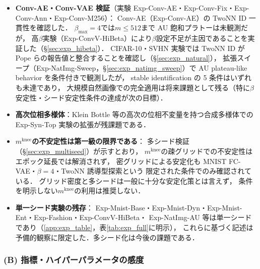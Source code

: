\documentclass[11pt,a4paper]{jsarticle}
\newcommand{\mknee}{m^{\mathrm{knee}}}
\begin{document}
\begin{itemize}
  \item \textbf{Conv-AE・Conv-VAE 検証}（実験 Exp-Conv-AE・Exp-Conv-Fix・Exp-Conv-Ann・Exp-Conv-M256）：
        Conv-AE（Exp-Conv-AE）の TwoNN ID 一貫性を確認した．
        $\beta_{\max}=4$では$m \leq 512$まで AU 飽和プラトーは未観測だが，
        高$\beta$実験（Exp-ConvV-HiBeta）により$\beta$設定不足が主因であることを実証した（§\ref{sec:exp_hibeta}）．
        CIFAR-10・SVHN 実験では TwoNN ID が Pope ら\cite{pope2021intrinsic}の報告値と整合することを確認し（§\ref{sec:exp_natural}），
        拡張スイープ（Exp-NatImg-Sweep，§\ref{sec:exp_natimg_sweep}）で AU plateau-like behavior を条件付きで観測したが，
        stable identification の 5 条件はいずれも未達であり，
        大規模自然画像での完全適用は将来課題として残る（特に$\beta$安定性・シード安定性条件の達成が次の目標）．
  \item \textbf{高次位相多様体}：Klein Bottle 等の高次の位相不変量を持つ合成多様体での
        Exp-Syn-Top 実験の拡張が残課題である．
  \item \textbf{$\mknee$の不安定性は第一級の限界である}：
        多シード検証（§\ref{sec:exp_multiseed}）が示すとおり，
        $\mknee$の疎グリッドでの不安定性はエポック延長では解消されず，
        密グリッドによる安定化も MNIST FC-VAE・$\beta=4$・TwoNN 誘導型探索という
        限定された条件でのみ確認されている．
        グリッド密度と多シードは一般に十分な安定化策とは言えず，
        条件を明示しない$\mknee$の利用は推奨しない．
  \item \textbf{単一シード実験の残存}：
        Exp-Mnist-Base・Exp-Mnist-Dyn・Exp-Mnist-Ent・Exp-Fashion・Exp-ConvV-HiBeta・
        Exp-NatImg-AU 等は単一シードであり（\ref{app:exp_table}，表\ref{tab:exp_full}に明示），
        これらに基づく記述は予備的観察に限定した．多シード化は今後の課題である．
\end{itemize}

\subsubsection*{(B) 指標・ハイパーパラメータの感度}
\end{document}
